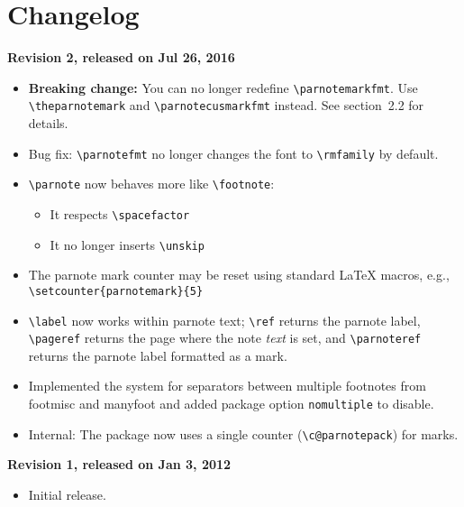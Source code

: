 \documentclass[10pt]{article}
\renewcommand{\parnotefmt}[1]{\centerline{\colorbox{black!10}{\parbox{0.82\textwidth}{\footnotesize\sffamily\noindent #1}}}}
\begin{document}
\section{Changelog}
{\raggedright
\noindent\textbf{Revision 2, released on Jul 26, 2016}
\begin{itemize}
\item \textbf{Breaking change:} You can no longer redefine \verb+\parnotemarkfmt+. Use \verb+\theparnotemark+ and \verb+\parnotecusmarkfmt+ instead. See section~2.2 for details.
\item Bug fix: \verb+\parnotefmt+ no longer changes the font to \verb+\rmfamily+ by default.
\item \verb+\parnote+ now behaves more like \verb+\footnote+:
	\begin{itemize}
	\item It respects \verb+\spacefactor+
	\item It no longer inserts \verb+\unskip+
	\end{itemize}
\item The parnote mark counter may be reset using standard LaTeX macros, e.g., \verb+\setcounter{parnotemark}{5}+
\item \verb+\label+ now works within parnote text; \verb+\ref+ returns the parnote label, \verb+\pageref+ returns the page where the note \emph{text} is set, and \verb+\parnoteref+ returns the parnote label formatted as a mark.
\item Implemented the system for separators between multiple footnotes from \textsf{footmisc} and \textsf{manyfoot} and added package option \texttt{nomultiple} to disable.
\item Internal: The package now uses a single counter (\verb+\c@parnotepack+) for marks.
\end{itemize}
\noindent\textbf{Revision 1, released on Jan 3, 2012}
\begin{itemize}
\item Initial release.
\end{itemize}}
\end{document}
